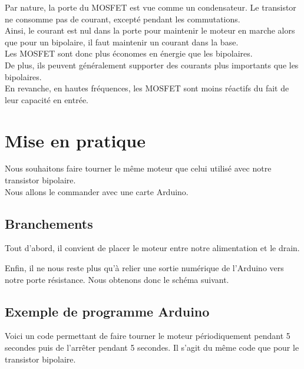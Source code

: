     Par nature, la porte du MOSFET est vue comme un condensateur. Le transistor ne consomme pas de courant, excepté pendant les commutations.\\
    Ainsi, le courant est nul dans la porte pour maintenir le moteur en marche alors que pour un bipolaire, il faut maintenir un courant dans la base.\\

    Les MOSFET sont donc plus économes en énergie que les bipolaires.\\
    De plus, ils peuvent généralement supporter des courants plus importants que les bipolaires.\\

    En revanche, en hautes fréquences, les MOSFET sont moins réactifs du fait de leur capacité en entrée.
     \section{Mise en pratique}

     Nous souhaitons faire tourner le même moteur que celui utilisé avec notre transistor bipolaire.\\
     Nous allons le commander avec une carte Arduino.

     \subsection{Branchements}

     Tout d'abord, il convient de placer le moteur entre notre alimentation et le drain.\\
     
 
 
     Enfin, il ne nous reste plus qu'à relier une sortie numérique de l'Arduino vers notre porte  résistance. Nous obtenons donc le schéma suivant.
 
  
     \subsection{Exemple de programme Arduino}
 
     Voici un code permettant de faire tourner le moteur périodiquement pendant 5 secondes puis de l'arrêter pendant 5 secondes. 
     Il s'agit du même code que pour le transistor bipolaire.
 
